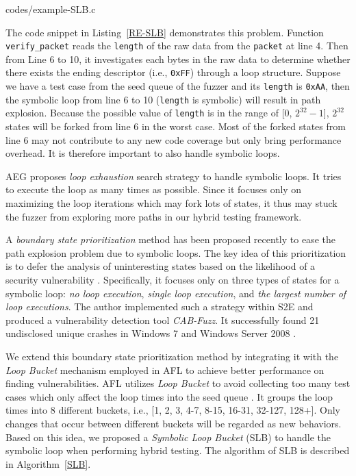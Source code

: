 
{codes/example-SLB.c} 

The code snippet in Listing~\ref{RE-SLB} demonstrates this problem. 
Function \texttt{verify\_packet} reads the \texttt{length} of the 
raw data from the \texttt{packet} at line 4.
 Then from Line 6 to 10, it investigates each bytes in the raw data 
 to determine whether there exists the ending descriptor 
 (i.e., \texttt{0xFF}) through a loop structure. 
 Suppose we have a test case from the seed queue of 
 the fuzzer and its \texttt{length} is \texttt{0xAA}, 
 then the symbolic loop 
 from line 6 to 10 (\texttt{length} is symbolic) 
 will result in path explosion.
 Because the possible value of \texttt{length} is in the 
 range of [0, $2^{32}-1$], $2^{32}$ states will be forked from 
 line 6 in the worst case. 
Most of the forked states from line 6 may not contribute 
to any new code coverage but only bring performance overhead.
It is therefore important to also handle symbolic loops. 

AEG \cite{Avgerinos:2014:AEG:2556647.2560219} proposes \emph{loop exhaustion}
search strategy to handle symbolic loops. It tries to execute the loop as many
times as possible. Since it focuses only on maximizing the loop iterations which
may fork lots of states, it thus may stuck the fuzzer from exploring more paths 
in our hybrid testing framework.

A \textit{boundary state prioritization} method has been proposed recently
to ease the path explosion problem due to symbolic loops.
The key idea of this prioritization is to defer the analysis of 
uninteresting states based on the likelihood of a security vulnerability \cite{cab-fuzz}. 
Specifically, it focuses only on three types of states for a symbolic 
loop: \textit{no loop execution}, \textit{single loop execution}, and 
\textit{the largest number of loop executions}.
The author implemented such a strategy within S2E \cite{chipounov2011s2e} 
and produced a vulnerability detection tool \textit{CAB-Fuzz}.
It successfully found 21 undisclosed unique crashes in Windows 7 and 
Windows Server 2008 \cite{cab-fuzz}.
 
We extend this boundary state prioritization method by integrating it 
with the \emph{Loop Bucket} mechanism employed in AFL \cite{online:afl} 
to achieve better performance on finding vulnerabilities.
AFL utilizes \emph{Loop Bucket} to avoid collecting too many test cases 
which only affect the loop times into the seed queue \cite{online:afl}. 
It groups the loop times into 8 different buckets, i.e., 
[1, 2, 3, 4-7, 8-15, 16-31, 32-127, 128+]. Only changes that occur 
between different buckets will be regarded as new behaviors. 
Based on this idea, we proposed a \textit{Symbolic Loop Bucket} (SLB) 
to handle the symbolic loop when performing hybrid testing. The 
algorithm of SLB is described in Algorithm~\ref{SLB}.

